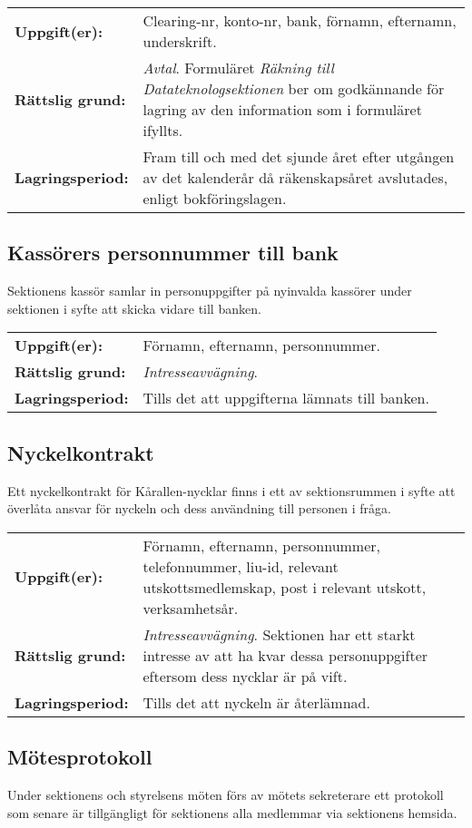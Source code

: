 \documentclass{datateknologsektionen-document}
\begin{document}
\begin{longtabu}{l X}
  \textbf{Uppgift(er):}    & Clearing-nr, konto-nr, bank, förnamn, efternamn, underskrift. \\
  \textbf{Rättslig grund:} & \textit{Avtal}. Formuläret \textit{Räkning till Datateknologsektionen} ber om godkännande för lagring av den information som i formuläret ifyllts. \\
  \textbf{Lagringsperiod:} & Fram till och med det sjunde året efter utgången av det kalenderår då räkenskapsåret avslutades, enligt bokföringslagen.
\end{longtabu}

\subsection{Kassörers personnummer till bank}
Sektionens kassör samlar in personuppgifter på nyinvalda kassörer under sektionen i syfte att skicka vidare till banken.

\begin{longtabu}{l X}
  \textbf{Uppgift(er):}    & Förnamn, efternamn, personnummer. \\
  \textbf{Rättslig grund:} & \textit{Intresseavvägning}. \\
  \textbf{Lagringsperiod:} & Tills det att uppgifterna lämnats till banken.
\end{longtabu}

\subsection{Nyckelkontrakt}
Ett nyckelkontrakt för Kårallen-nycklar finns i ett av sektionsrummen i syfte att överlåta ansvar för nyckeln och dess användning till personen i fråga.

\begin{longtabu}{l X}
  \textbf{Uppgift(er):}    & Förnamn, efternamn, personnummer, telefonnummer, liu-id, relevant utskottsmedlemskap, post i relevant utskott, verksamhetsår. \\
  \textbf{Rättslig grund:} & \textit{Intresseavvägning}. Sektionen har ett starkt intresse av att ha kvar dessa personuppgifter eftersom dess nycklar är på vift.\\
  \textbf{Lagringsperiod:} & Tills det att nyckeln är återlämnad.
\end{longtabu}

\subsection{Mötesprotokoll}
Under sektionens och styrelsens möten förs av mötets sekreterare ett protokoll som senare är tillgängligt för sektionens alla medlemmar via sektionens hemsida.
\end{document}
